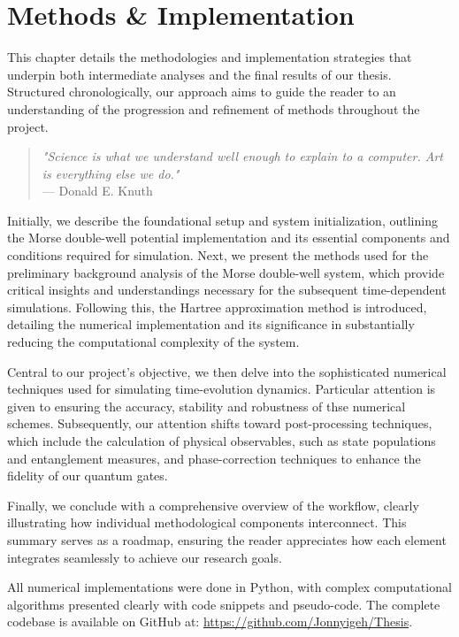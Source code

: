 \documentclass{subfiles}
\begin{document}
\chapter{Methods \& Implementation}\label{chap:3}
This chapter details the methodologies and implementation strategies that underpin both intermediate analyses and the final results of our thesis. Structured chronologically, our approach aims to guide the reader to an understanding of the progression and refinement of methods throughout the project. 

\begin{quote}
    \centering
    \textit{"Science is what we understand well enough to explain to a computer. Art is everything else we do."}\\
    \vspace{0.2cm}
    --- Donald E. Knuth
\end{quote}


Initially, we describe the foundational setup and system initialization, outlining the Morse double-well potential implementation and its essential components and conditions required for simulation. Next, we present the methods used for the preliminary background analysis of the Morse double-well system, which provide critical insights and understandings necessary for the subsequent time-dependent simulations. Following this, the Hartree approximation method is introduced, detailing the numerical implementation and its significance in substantially reducing the computational complexity of the system.

Central to our project's objective, we then delve into the sophisticated numerical techniques used for simulating time-evolution dynamics. Particular attention is given to ensuring the accuracy, stability and robustness of thse numerical schemes. Subsequently, our attention shifts toward post-processing techniques, which include the calculation of physical observables, such as state populations and entanglement measures, and phase-correction techniques to enhance the fidelity of our quantum gates.

Finally, we conclude with a comprehensive overview of the workflow, clearly illustrating how individual methodological components interconnect. This summary serves as a roadmap, ensuring the reader appreciates how each element integrates seamlessly to achieve our research goals.

All numerical implementations were done in Python, with complex computational algorithms presented clearly with code snippets and pseudo-code. The complete codebase is available on GitHub at: \url{https://github.com/Jonnyigeh/Thesis}.
\newpage






\end{document}

